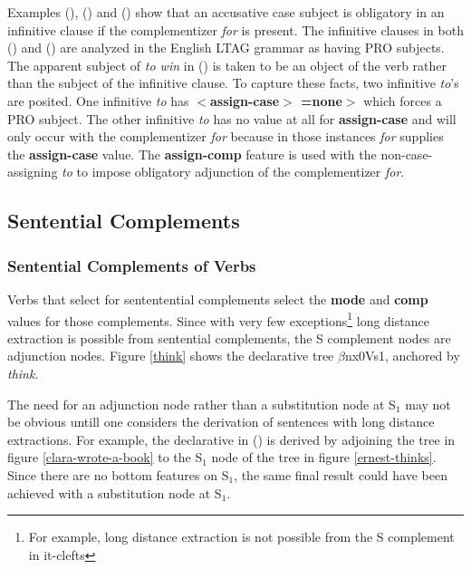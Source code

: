 

Examples (), () and () show that an accusative
case subject is obligatory in an infinitive clause if the
complementizer {\it for\/} is present. The infinitive clauses in both
() and () are analyzed in the English LTAG grammar as
having PRO subjects.  The apparent subject of {\it to win\/} in
() is taken to be an object of the verb rather than the subject
of the infinitive clause.  To capture these facts, two infinitive
{\it to}'s are posited. One infinitive {\it to\/} has {\bf
$<$assign-case$>$ =none$>$} which forces a PRO subject. The other
infinitive {\it to\/} has no value at all for {\bf assign-case} and
will only occur with the complementizer {\it for\/} because in those
instances {\it for} supplies the {\bf assign-case} value. The {\bf
assign-comp} feature is used with the non-case-assigning {\it to} to
impose obligatory adjunction of the complementizer {\it for}.

 
\subsection{Sentential Complements}
\subsubsection{Sentential Complements of Verbs}
Verbs that select for sententential complements select the {\bf mode}
and {\bf comp} values for those complements. Since with very few
exceptions\footnote{For example, long distance extraction is not
possible from the S complement in it-clefts} long distance extraction
is possible from sentential complements, the S complement nodes are
adjunction nodes. Figure \ref{think} shows the declarative tree
$\beta$nx0Vs1, anchored by {\it think}.  


The need for an adjunction node rather than a substitution node  at
S$_{1}$ may not be obvious untill one considers the derivation of
sentences with long distance extractions.  For example, the
declarative in () is derived by adjoining the tree in figure
\ref{clara-wrote-a-book} to the S$_{1}$ node of the tree in
figure \ref{ernest-thinks}.  Since there are no bottom features on
S$_{1}$, the same final result could have been achieved with a
substitution node at S$_{1}$. 


